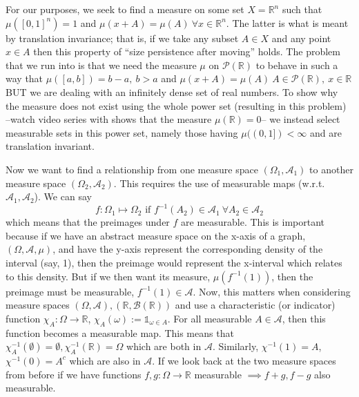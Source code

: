 \documentclass[titlepage]{book}
\begin{document}
\begin{flushleft}
    For our purposes, we seek to find a measure on some set $X = \mathbb{R}^n$ such that $\mu([0,1]^n) = 1$ and $\mu(x + A) = \mu(A)~\forall x \in \mathbb{R}^n$. The latter is what is meant by translation invariance; that is, if we take any subset $A \in X$ and any point $x \in A$ then this property of ``size persistence after moving'' holds. The problem that we run into is that we need the measure $\mu$ on $\mathcal{P}(\mathbb{R})$ to behave in such a way that $\mu([a, b]) = b-a,~b>a$ and $\mu(x+A) = \mu(A)~A\in \mathcal{P}(\mathbb{R}),~x\in\mathbb{R}$ BUT we are dealing with an infinitely dense set of real numbers. To show why the measure does not exist using the whole power
    set (resulting in this problem) --watch video series with shows that the measure $\mu(\mathbb{R}) = 0$-- we instead select measurable sets in this power set, namely those having $\mu((0, 1]) < \infty$ and are translation invariant.
\end{flushleft}
\begin{flushleft}
    Now we want to find a relationship from one measure space $(\Omega_1, \mathcal{A}_1)$ to another measure space $(\Omega_2, \mathcal{A}_2)$. This requires the use of measurable maps (w.r.t. $\mathcal{A}_1, \mathcal{A}_2$). We can say $$f: \Omega_1 \mapsto \Omega_2 \text{  if  } f^{-1}(A_2) \in \mathcal{A}_1~\forall A_2 \in \mathcal{A}_2$$ which means that the preimages under $f$ are measurable. This is important because if we have an abstract measure space on the x-axis of a graph, $(\Omega, \mathcal{A}, \mu)$, and have the y-axis represent the corresponding density of the interval (say, 1), then the preimage would represent the x-interval which relates to this density. But if we then want its measure, $\mu(f^{-1}({1}))$, then the preimage must be measurable, $f^{-1}({1}) \in \mathcal{A}$.
    Now, this matters when considering measure spaces $(\Omega, \mathcal{A}), (\mathbb{R}, \mathcal{B}(\mathbb{R}))$ and use a characteristic (or indicator) function $\chi_A: \Omega \rightarrow \mathbb{R}$, $\chi_A(\omega) := \mathbb{1}_{\omega \in A}$. For all measurable $A \in \mathcal{A}$, then this function becomes a measurable map. This means that $\chi^{-1}_A(\emptyset) = \emptyset, \chi^{-1}_A(\mathbb{R}) = \Omega$ which are both in $\mathcal{A}$. Similarly, $\chi^{-1}({1}) = A$, $\chi^{-1}({0}) = A^c$ which are also in $\mathcal{A}$. If we look back at the two measure spaces from before if we have functions $f,g:  \Omega \rightarrow \mathbb{R}$ measurable $\implies f+g, f-g$ also measurable.
\end{flushleft}
\end{document}
